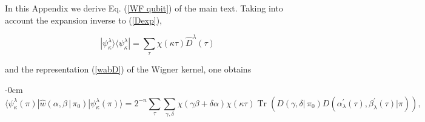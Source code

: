 \documentclass[quantumrep,article,submit,pdftex,moreauthors]{Definitions/mdpi}
\DeclareMathOperator{\Tr}{Tr}
\begin{document}
\vspace{6pt}


\authorcontributions{}




\appendixstart\appendix

\section[\appendixname~\thesection]{}
\label{appA}

\color{teal}
In this Appendix we derive Eq. (\ref{WF qubit}) of the main text. Taking into
account the expansion inverse to (\ref{Dexp}),

\begin{equation}
  |\psi_{\kappa }^{\lambda}\rangle \langle \psi_{\kappa }^{\lambda}|
  = \sum_{\tau }\chi (\kappa \tau )\hat{D}^{\lambda }(\tau )
\end{equation}

and the representation (\ref{wabD}) of the Wigner kernel, one obtains

\begin{adjustwidth}{-\extralength}{0cm}
\begin{equation}
  \langle \psi_{\kappa}^{\lambda}(\pi)
  |\hat{w}\left(\alpha,\beta\,|\,\pi_{0}\right)
  |\psi_{\kappa}^{\lambda}(\pi)\rangle
  = 2^{-n} \sum_{\tau} \sum\limits_{\gamma,\delta}
  \chi\left( \gamma \beta + \delta \alpha \right)\chi(\kappa \tau)
  \Tr\left(
    D\left( \gamma, \delta |\,\pi_{0} \right)
    D\left(
      \alpha_{\lambda}^{\prime}(\tau),\beta_{\lambda}^{\prime }(\tau)|\pi
    \right)
  \right),
\end{equation}
\end{adjustwidth}
\end{document}
